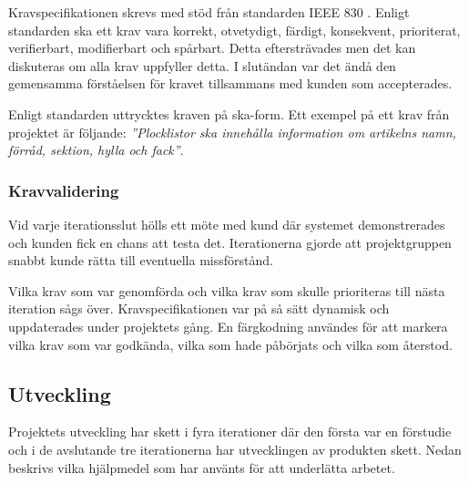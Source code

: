 \documentclass{article}
\begin{document}
Kravspecifikationen skrevs med stöd från standarden IEEE 830 \cite{ieee830}. Enligt standarden ska ett krav vara korrekt, otvetydigt, färdigt, konsekvent, prioriterat, verifierbart, modifierbart och spårbart. Detta eftersträvades men det kan diskuteras om alla krav uppfyller detta. I slutändan var det ändå den gemensamma förståelsen för kravet tillsammans med kunden som accepterades. 

Enligt standarden uttrycktes kraven på ska-form. Ett exempel på ett krav från projektet är följande: \textit{''Plocklistor ska innehålla information om artikelns namn, förråd, sektion, hylla och fack''}.

\subsubsection{Kravvalidering}
Vid varje iterationsslut hölls ett möte med kund där systemet demonstrerades och kunden fick en chans att testa det. Iterationerna gjorde att projektgruppen snabbt kunde rätta till eventuella missförstånd. 

Vilka krav som var genomförda och vilka krav som skulle prioriteras till nästa iteration sågs över. Kravspecifikationen var på så sätt dynamisk och uppdaterades under projektets gång. En färgkodning användes för att markera vilka krav som var godkända, vilka som hade påbörjats och vilka som återstod.

\subsection{Utveckling}
Projektets utveckling har skett i fyra iterationer där den första var en förstudie och i de avslutande tre iterationerna har utvecklingen av produkten skett. Nedan beskrivs vilka hjälpmedel som har använts för att underlätta arbetet.
\end{document}
